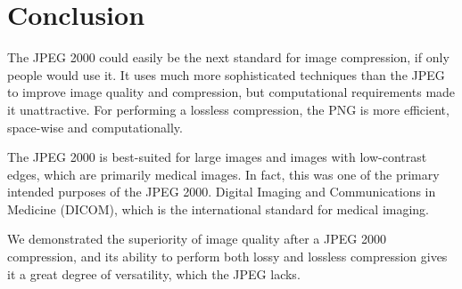 \documentclass[titlepage,12pt]{article}
\begin{document}
\section{Conclusion}

The JPEG 2000 could easily be the next standard for image compression, if only people would use it.
It uses much more sophisticated techniques than the JPEG to improve image quality and compression,
but computational requirements made it unattractive.
For performing a lossless compression, the PNG is more efficient, space-wise and computationally.

The JPEG 2000 is best-suited for large images and images with low-contrast edges,
which are primarily medical images.
In fact, this was one of the primary intended purposes of the JPEG 2000.
Digital Imaging and Communications in Medicine (DICOM), 
which is the international standard for medical imaging.\cite{dicom}

We demonstrated the superiority of image quality after a JPEG 2000 compression, 
and its ability to perform both lossy and lossless compression gives it a 
great degree of versatility, which the JPEG lacks.


\printbibliography[]
\end{document}
